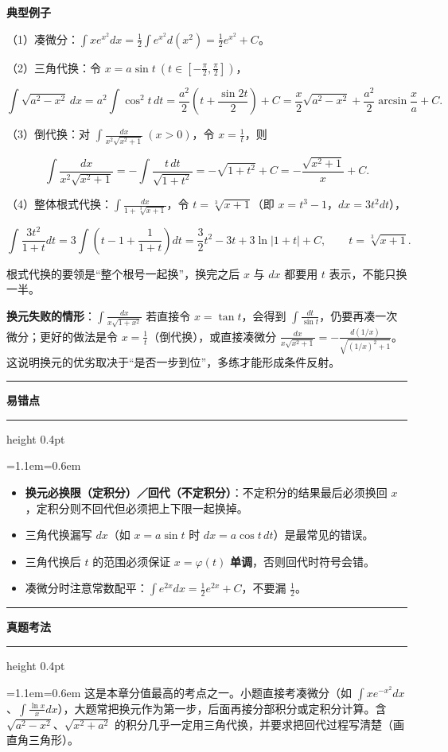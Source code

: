 \documentclass[11pt,openany,UTF8]{ctexbook}
\newcommand{\callouthead}[2]{%
  \par\addvspace{7pt}\noindent
  {\color{#1}\rule[-0.15em]{3pt}{1.05em}}\hspace{0.5em}%
  {\bfseries\color{#1}#2}\par\nobreak\vspace{-0.35em}%
  {\color{rulesep}\hrule height 0.4pt}\nobreak\vspace{0.45em}%
  \begingroup\small\setlength{\parindent}{0pt}%
  \leftskip=1.1em\rightskip=0.6em\noindent\ignorespaces}
\newcommand{\calloutend}{\par\endgroup\addvspace{7pt}}
\newenvironment{callwarn}[1]{\callouthead{warnbar}{#1}}{\calloutend}
\newenvironment{callexam}[1]{\callouthead{exambar}{#1}}{\calloutend}
\begin{document}
\textbf{典型例子}

（1）凑微分：$\displaystyle\int xe^{x^2}dx=\frac{1}{2}\int e^{x^2}d(x^2)=\frac{1}{2}e^{x^2}+C$。

（2）三角代换：令 $x=a\sin t\ \left(t\in\left[-\frac{\pi}{2},\frac{\pi}{2}\right]\right)$，

\[\int\sqrt{a^2-x^2}\,dx=a^2\int\cos^2t\,dt=\frac{a^2}{2}\left(t+\frac{\sin 2t}{2}\right)+C=\frac{x}{2}\sqrt{a^2-x^2}+\frac{a^2}{2}\arcsin\frac{x}{a}+C.\]

（3）倒代换：对 $\displaystyle\int\frac{dx}{x^2\sqrt{x^2+1}}\ (x>0)$，令 $x=\frac{1}{t}$，则

\[\int\frac{dx}{x^2\sqrt{x^2+1}}=-\int\frac{t\,dt}{\sqrt{1+t^2}}=-\sqrt{1+t^2}+C=-\frac{\sqrt{x^2+1}}{x}+C.\]

（4）整体根式代换：$\displaystyle\int\frac{dx}{1+\sqrt[3]{x+1}}$，令 $t=\sqrt[3]{x+1}$（即 $x=t^3-1$，$dx=3t^2dt$），

\[\int\frac{3t^2}{1+t}dt=3\int\left(t-1+\frac{1}{1+t}\right)dt=\frac{3}{2}t^2-3t+3\ln\lvert 1+t\rvert+C,\qquad t=\sqrt[3]{x+1}.\]

根式代换的要领是“整个根号一起换”，换完之后 $x$ 与 $dx$ 都要用 $t$ 表示，不能只换一半。

\textbf{换元失败的情形}：$\int\frac{dx}{x\sqrt{1+x^2}}$ 若直接令 $x=\tan t$，会得到 $\int\frac{dt}{\sin t}$，仍要再凑一次微分；更好的做法是令 $x=\frac{1}{t}$（倒代换），或直接凑微分 $\frac{dx}{x\sqrt{x^2+1}}=-\frac{d(1/x)}{\sqrt{(1/x)^2+1}}$。这说明换元的优劣取决于“是否一步到位”，多练才能形成条件反射。

\begin{callwarn}{易错点}
\begin{itemize}
\item \textbf{换元必换限（定积分）／回代（不定积分）}：不定积分的结果最后必须换回 $x$，定积分则不回代但必须把上下限一起换掉。
\item 三角代换漏写 $dx$（如 $x=a\sin t$ 时 $dx=a\cos t\,dt$）是最常见的错误。
\item 三角代换后 $t$ 的范围必须保证 $x=\varphi(t)$ \textbf{单调}，否则回代时符号会错。
\item 凑微分时注意常数配平：$\int e^{2x}dx=\frac{1}{2}e^{2x}+C$，不要漏 $\frac{1}{2}$。
\end{itemize}
\end{callwarn}

\begin{callexam}{真题考法}
这是本章分值最高的考点之一。小题直接考凑微分（如 $\int xe^{-x^2}dx$、$\int\frac{\ln x}{x}dx$），大题常把换元作为第一步，后面再接分部积分或定积分计算。含 $\sqrt{a^2-x^2}$、$\sqrt{x^2+a^2}$ 的积分几乎一定用三角代换，并要求把回代过程写清楚（画直角三角形）。

\end{callexam}
\end{document}
